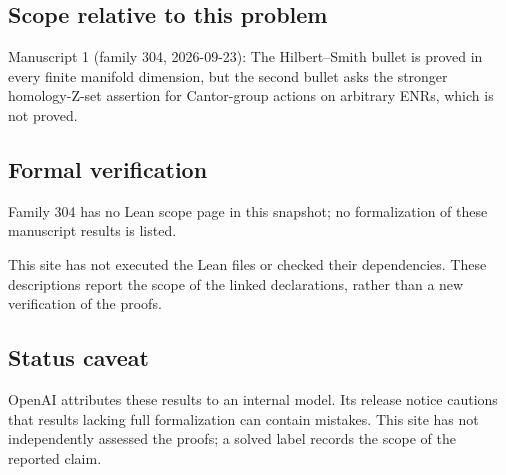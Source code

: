 \documentclass[11pt]{article}
\begin{document}
\subsection{Scope relative to this problem}
Manuscript 1 (family 304, 2026-09-23): The Hilbert–Smith bullet is proved in every finite manifold dimension, but the second bullet asks the stronger homology-Z-set assertion for Cantor-group actions on arbitrary ENRs, which is not proved.

\subsection{Formal verification}
Family 304 has no Lean scope page in this snapshot; no formalization of these manuscript results is listed.

This site has not executed the Lean files or checked their dependencies. These descriptions report the scope of the linked declarations, rather than a new verification of the proofs.

\subsection{Status caveat}
OpenAI attributes these results to an internal model. Its release notice cautions that results lacking full formalization can contain mistakes. This site has not independently assessed the proofs; a solved label records the scope of the reported claim.
\end{document}
